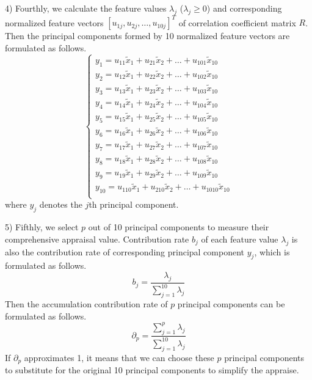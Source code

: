 \documentclass{apmcmthesis}
\begin{document}
4) Fourthly, we calculate the feature values $\lambda_j$ (${\lambda_j}\ge0$) and corresponding normalized feature vectors ${{[{{u}_{1j}},{{u}_{2j}},\ldots ,{{u}_{10j}}]}^{T}}$ of correlation coefficient matrix $R$. Then the principal components formed by 10 normalized feature vectors are formulated as follows.
\begin{equation}
\left\{ \begin{array}{*{35}{l}}
   {{y}_{1}}={{u}_{11}}{{{\tilde{x}}}_{1}}+{{u}_{21}}{{{\tilde{x}}}_{2}}+\ldots +{{u}_{101}}{{{\tilde{x}}}_{10}}  \\
   {{y}_{2}}={{u}_{12}}{{{\tilde{x}}}_{1}}+{{u}_{22}}{{{\tilde{x}}}_{2}}+\ldots +{{u}_{102}}{{{\tilde{x}}}_{10}}  \\
   {{y}_{3}}={{u}_{13}}{{{\tilde{x}}}_{1}}+{{u}_{23}}{{{\tilde{x}}}_{2}}+\ldots +{{u}_{103}}{{{\tilde{x}}}_{10}}  \\
   {{y}_{4}}={{u}_{14}}{{{\tilde{x}}}_{1}}+{{u}_{24}}{{{\tilde{x}}}_{2}}+\ldots +{{u}_{104}}{{{\tilde{x}}}_{10}}  \\
   {{y}_{5}}={{u}_{15}}{{{\tilde{x}}}_{1}}+{{u}_{25}}{{{\tilde{x}}}_{2}}+\ldots +{{u}_{105}}{{{\tilde{x}}}_{10}}  \\
   {{y}_{6}}={{u}_{16}}{{{\tilde{x}}}_{1}}+{{u}_{26}}{{{\tilde{x}}}_{2}}+\ldots +{{u}_{106}}{{{\tilde{x}}}_{10}}  \\
   {{y}_{7}}={{u}_{17}}{{{\tilde{x}}}_{1}}+{{u}_{27}}{{{\tilde{x}}}_{2}}+\ldots +{{u}_{107}}{{{\tilde{x}}}_{10}}  \\
   {{y}_{8}}={{u}_{18}}{{{\tilde{x}}}_{1}}+{{u}_{28}}{{{\tilde{x}}}_{2}}+\ldots +{{u}_{108}}{{{\tilde{x}}}_{10}}  \\
   {{y}_{9}}={{u}_{19}}{{{\tilde{x}}}_{1}}+{{u}_{29}}{{{\tilde{x}}}_{2}}+\ldots +{{u}_{109}}{{{\tilde{x}}}_{10}}  \\
   {{y}_{10}}={{u}_{110}}{{{\tilde{x}}}_{1}}+{{u}_{210}}{{{\tilde{x}}}_{2}}+\ldots +{{u}_{1010}}{{{\tilde{x}}}_{10}}  \\
\end{array} \right.
\end{equation}
where $y_j$ denotes the $j$th principal component.

5) Fifthly, we select $p$ out of 10 principal components to measure their comprehensive appraisal value. Contribution rate $b_j$ of each feature value $\lambda_j$ is also the contribution rate of corresponding principal component $y_j$, which is formulated as follows.
\begin{equation}
{{b}_{j}}=\frac{{{\lambda }_{j}}}{\sum\limits_{j=1}^{10}{{{\lambda }_{j}}}}
\end{equation}
Then the accumulation contribution rate of $p$ principal components can be formulated as follows.
\begin{equation}
{{\partial }_{p}}=\frac{\sum\limits_{j=1}^{p}{{{\lambda }_{j}}}}{\sum\limits_{j=1}^{10}{{{\lambda }_{j}}}}
\end{equation}
If $\partial_p$ approximates 1, it means that we can choose these $p$ principal components to substitute for the original 10 principal components to simplify the appraise.
\end{document}
